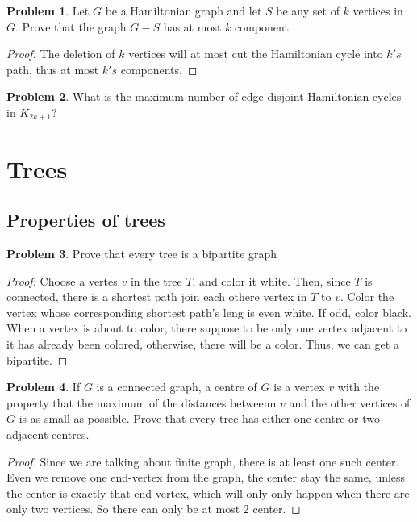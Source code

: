 \documentclass[a4paper,11pt]{article}%
\theoremstyle{remark}
\theoremstyle{definition}
\newtheorem{problem}{Problem}[subsection]
\begin{document}
\begin{problem}
    Let $G$ be a Hamiltonian graph and let $S$ be any set of $k$ vertices in $G$.
    Prove that the graph $G-S$ has at most $k$ component.
    \begin{proof}
        The deletion of $k$ vertices will at most cut the Hamiltonian cycle into 
        $k's$ path, thus at most $k's$ components.
    \end{proof}
\end{problem}
\begin{problem}
    What is the maximum number of edge-disjoint Hamiltonian cycles in $K_{2k+1}$?
\end{problem}
\section{Trees}
\subsection{ Properties of trees}
\begin{problem}
    Prove that every tree is a bipartite graph
    \begin{proof}
        Choose a vertes $v$ in the tree $T$, and color it 
        white. Then, since $T$ is connected, there is a shortest 
        path join each othere vertex in $T$ to $v$. Color the 
        vertex whose corresponding shortest path's leng is even 
        white. If odd, color black.
        When a vertex is about to color, there suppose to be 
        only one vertex adjacent to it has already been colored,
        otherwise, there will be a color. Thus, we can get a bipartite.
    \end{proof}
\end{problem}
\begin{problem}
    If $G$ is a connected graph, a centre of $G$ 
    is a vertex $v$ with the property that the maximum 
    of the distances betweenn $v$ and the other vertices of $G$
    is as small as possible. Prove that every tree has either one centre 
    or two adjacent centres.
    \begin{proof}
       Since we are talking about finite graph, there is at least one such 
    center. Even we remove one end-vertex from the graph, the center stay the 
    same, unless the center is exactly that end-vertex, which will only 
    only happen when there are only two vertices. So there can only be at most 
    2 center.
    \end{proof}
\end{problem}
\end{document}
